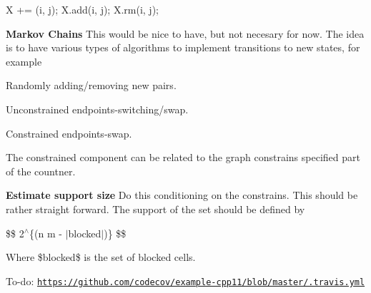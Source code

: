 \begin{DoxyCode}
X += (i, j);
X.add(i, j);
X.rm(i, j);
\end{DoxyCode}



\begin{DoxyItemize}
\item {\bfseries Markov Chains} This would be nice to have, but not necesary for now. The idea is to have various types of algorithms to implement transitions to new states, for example
\begin{DoxyItemize}
\item Randomly adding/removing new pairs.
\item Unconstrained endpoints-\/switching/swap.
\item Constrained endpoints-\/swap.
\end{DoxyItemize}

The constrained component can be related to the graph constrains specified part of the countner.
\item {\bfseries Estimate support size} Do this conditioning on the constrains. This should be rather straight forward. The support of the set should be defined by

\$\$ 2$^\wedge$\{(n m -\/ $\vert$blocked$\vert$)\} \$\$

Where \$blocked\$ is the set of blocked cells.
\end{DoxyItemize}

To-\/do\+: \href{https://github.com/codecov/example-cpp11/blob/master/.travis.yml}{\tt https\+://github.\+com/codecov/example-\/cpp11/blob/master/.\+travis.\+yml} 